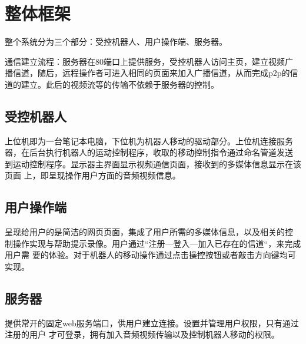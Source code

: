 \chapter{整体框架}

整个系统分为三个部分：受控机器人、用户操作端、服务器。

通信建立流程：服务器在80端口上提供服务，受控机器人访问主页，建立视频广
播信道，随后，远程操作者可进入相同的页面来加入广播信道，从而完成p2p的信
道的建立。此后的视频流等的传输不依赖于服务器的控制。

\section{受控机器人}

上位机即为一台笔记本电脑，下位机为机器人移动的驱动部分。上位机连接服务
器，在后台执行机器人的运动控制程序，收取的移动控制指令通过命名管道发送
到运动控制程序。显示器主界面显示视频通信页面，接收到的多媒体信息显示在该页面
上，即呈现操作用户方面的音频视频信息。

\section{用户操作端}

呈现给用户的是简洁的网页页面，集成了用户所需的多媒体信息，以及相关的控
制操作实现与帮助提示录像。用户通过“注册—登入—加入已存在的信道“，来完成用户需
要的体验。对于机器人的移动操作通过点击操控按钮或者敲击方向键均可实现。

\section{服务器}

提供常开的固定web服务端口，供用户建立连接。设置并管理用户权限，只有通过注册的用户
才可登录，拥有加入音频视频传输以及控制机器人移动的权限。
